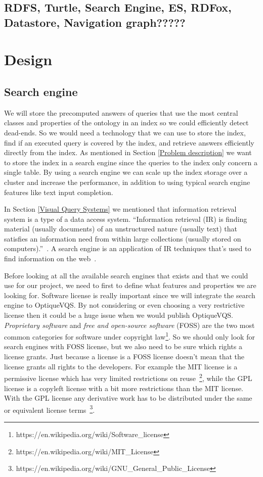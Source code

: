 \documentclass[a4paper,english]{ifimaster/ifimaster}
\begin{document}
\section{RDFS, Turtle, Search Engine, ES, RDFox, Datastore, Navigation graph?????}

\chapter{Design}

\section{Search engine}
We will store the precomputed answers of queries that use the most central classes and properties of the ontology in an index so we could efficiently detect dead-ends. So we would need a technology that we can use to store the index, find if an executed query is covered by the index, and retrieve answers efficiently directly from the index. As mentioned in Section \ref{Problem description} we want to store the index in a search engine since the queries to the index only concern a single table. By using a search engine we can scale up the index storage over a cluster and increase the performance, in addition to using typical search engine features like text input completion.

In Section \ref{Visual Query Systems} we mentioned that information retrieval system is a type of a data access system. ``Information retrieval (IR) is finding material (usually documents) of an unstructured nature (usually text) that satisfies an information need from within large collections (usually stored on computers).''~\cite{IR_book}. A search engine is an application of IR techniques that's used to find information on the web~\cite{IR_and_SE}.

Before looking at all the available search engines that exists and that we could use for our project, we need to first to define what features and properties we are looking for. Software license is really important since we will integrate the search engine to OptiqueVQS. By not considering or even choosing a very restrictive license then it could be a huge issue when we would publish OptiqueVQS. \textit{Proprietary software} and \textit{free and open-source software} (FOSS) are the two most common categories for software under copyright law\footnote{https://en.wikipedia.org/wiki/Software\_license}. So we should only look for search engines with FOSS license, but we also need to be sure which rights a license grants. Just because a license is a FOSS license doesn't mean that the license grants all rights to the developers. For example the MIT license is a permissive license which has very limited restrictions on reuse~\footnote{https://en.wikipedia.org/wiki/MIT\_License}, while the GPL license is a copyleft license with a bit more restrictions than the MIT license. With the GPL license any derivative work has to be distributed under the same or equivalent license terms~\footnote{https://en.wikipedia.org/wiki/GNU\_General\_Public\_License}. 
\end{document}
